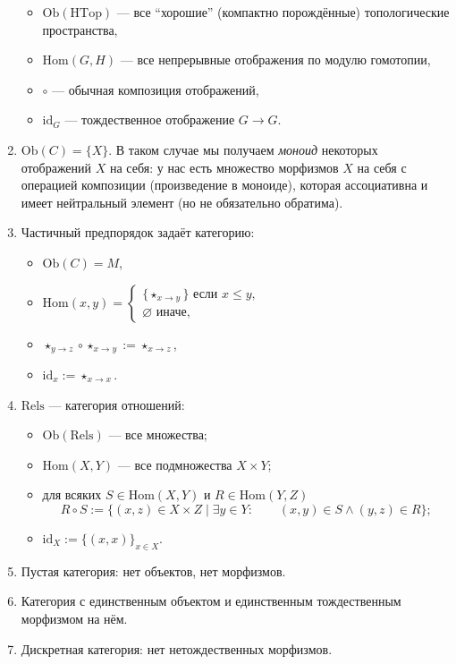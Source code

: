 \documentclass[12pt,a4paper]{article}
\newcommand{\Hom}{\mathrm{Hom}}
\newcommand{\Ob}{\mathrm{Ob}}
\newcommand{\id}{\mathrm{id}}
\newcommand{\HTop}{\mathrm{HTop}}
\newcommand{\Rels}{\mathrm{Rels}}
\begin{document}
\begin{example}
\begin{enumerate}
\begin{itemize}
                    \item $\Ob(\HTop)$ --- все ``хорошие'' (компактно порождённые) топологические пространства,
                    \item $\Hom(G, H)$ --- все непрерывные отображения по модулю гомотопии,
                    \item $\circ$ --- обычная композиция отображений,
                    \item $\id_G$ --- тождественное отображение $G \to G$.
                \end{itemize}
            \item $\Ob(C) = \{X\}$. В таком случае мы получаем \emph{моноид} некоторых отображений $X$ на себя: у нас есть множество морфизмов $X$ на себя с операцией композиции (произведение в моноиде), которая ассоциативна и имеет нейтральный элемент (но не обязательно обратима).
            \item Частичный предпорядок задаёт категорию:
                \begin{itemize}
                    \item $\Ob(C) = M$,
                    \item
                        $\Hom(x, y) = \begin{cases}
                            \{\star_{x\to y}\} \text{ если } x \leqslant y,\\
                            \varnothing \text{ иначе},
                        \end{cases}$
                    \item $\star_{y\to z} \circ \star_{x\to y} := \star_{x\to z}$,
                    \item $\id_x := \star_{x\to x}$.
                \end{itemize}
            \item $\Rels$ --- категория отношений:
                \begin{itemize}
                    \item $\Ob(\Rels)$ --- все множества;
                    \item $\Hom(X, Y)$ --- все подмножества $X \times Y$;
                    \item для всяких $S \in \Hom(X, Y)$ и $R \in \Hom(Y, Z)$
                        \[R \circ S := \{(x, z) \in X \times Z \mid \exists y \in Y: \qquad (x, y) \in S \wedge (y, z) \in R\};\]
                    \item $\id_X := \{(x, x)\}_{x \in X}$. 
                \end{itemize}
            \item Пустая категория: нет объектов, нет морфизмов.
            \item Категория с единственным объектом и единственным тождественным морфизмом на нём.
            \item Дискретная категория: нет нетождественных морфизмов.
        \end{enumerate}
    \end{example}
\end{document}
